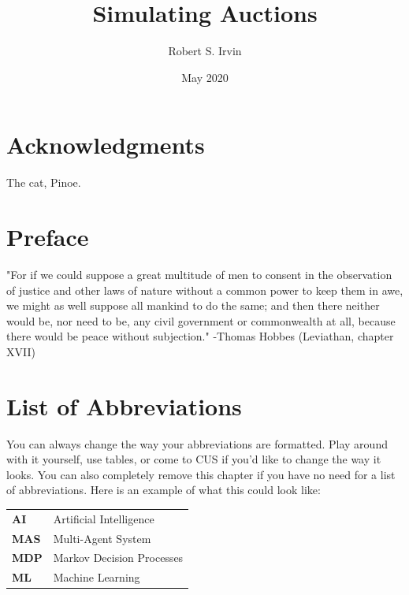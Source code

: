 \documentclass[12pt,twoside]{reedthesis}
\title{Simulating Auctions}
\author{Robert S. Irvin}
\date{May 2020}
\begin{document}
  \maketitle
  \frontmatter %
  \pagestyle{empty} %

    \chapter*{Acknowledgments}
	The cat, Pinoe.

    \chapter*{Preface}
	"For if we could suppose a great multitude of men to consent in the observation of justice and other laws of nature without a common power to keep them in awe, we might as well suppose all mankind to do the same; and then there neither would be, nor need to be, any civil government or commonwealth at all, because there would be peace without subjection." -Thomas Hobbes (Leviathan, chapter XVII)
	
	

    \chapter*{List of Abbreviations}
		You can always change the way your abbreviations are formatted. Play around with it yourself, use tables, or come to CUS if you'd like to change the way it looks. You can also completely remove this chapter if you have no need for a list of abbreviations. Here is an example of what this could look like:

	\begin{table}[h]
	\centering %
	\begin{tabular}{ll}
		\textbf{AI}  	&  Artificial Intelligence\\
		\textbf{MAS}  	&  Multi-Agent System\\
		\textbf{MDP}    &  Markov Decision Processes\\
		\textbf{ML}     &  Machine Learning\\
	\end{tabular}
	\end{table}
	
\end{document}
